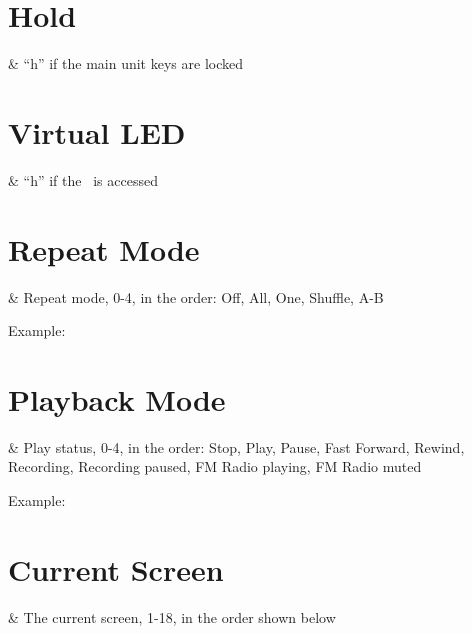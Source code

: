 \section{Hold}
    \begin{tagmap}
         & ``h'' if the main unit keys are locked\\
    \end{tagmap}

\section{Virtual LED}
  \begin{tagmap}
     & ``h'' if the \disk\ is accessed\\
  \end{tagmap}

\section{Repeat Mode}
  \begin{tagmap}
     & Repeat mode, 0-4, in the order: Off, All, One, Shuffle, A-B\\
  \end{tagmap}
Example: 

\section{Playback Mode}
  \begin{tagmap}
     & Play status, 0-4, in the order: Stop, Play, Pause, 
           Fast Forward, Rewind, Recording, Recording paused, FM Radio playing,
           FM Radio muted\\
  \end{tagmap}
Example: 

\section{Current Screen}
  \begin{tagmap}
     & The current screen, 1-18, in the order shown below\\
  \end{tagmap}


